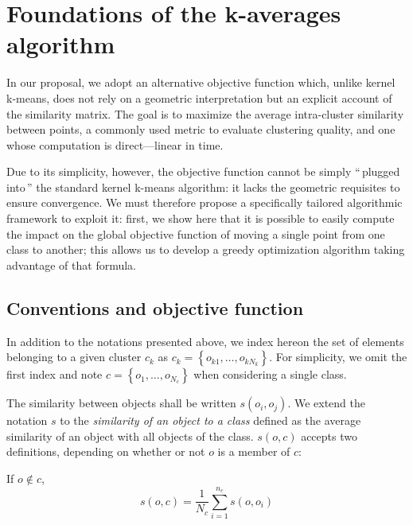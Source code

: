 \documentclass[natbib,smallextended]{svjour3}
\newcommand{\cad}{---} %
\newcommand{\gl}[1]{``\,#1\,''} %
\begin{document}
\section{Foundations of the k-averages algorithm} \label{sec:kaverages}

In our proposal, we adopt an alternative objective function which, unlike kernel k-means, does not rely on a geometric interpretation but an explicit account of the similarity matrix. The goal is to maximize the average intra-cluster similarity between points, a commonly used metric to evaluate clustering quality, and one whose computation is direct\cad{}linear in time.

Due to its simplicity, however, the objective function cannot be simply \gl{plugged into} the standard kernel k-means algorithm: it lacks the geometric requisites to ensure convergence. We must therefore propose a specifically tailored algorithmic framework to exploit it: first, we show here that it is possible to easily compute the impact on the global objective function of moving a single point from one class to another; this allows us to develop a greedy optimization algorithm taking advantage of that formula.

\subsection{Conventions and objective function}

In addition to the notations presented above, we index hereon the set of elements belonging to a given cluster $c_k$ as $c_k = \left\{o_{k1}, \ldots, o_{kN_k}\right\}$.
For simplicity, we omit the first index and note $c = \left\{o_1, \ldots, o_{N_c}\right\}$ when considering a single class.

The similarity between objects shall be written $s\left(o_i, o_j\right)$.
We extend the notation $s$ to the \emph{similarity of an object to a
  class} defined as the average similarity of an object
with all objects of the class. $s(o,c)$ accepts two definitions,
depending on whether or not $o$ is a member of $c$:

If $o \notin c$,
\begin{equation}
  s\left(o,c\right) = \frac{1}{N_c} \sum_{i=1}^{n_c}s\left(o, o_i\right)
   \label{eq:soc_notinclass}
\end{equation}
\end{document}
